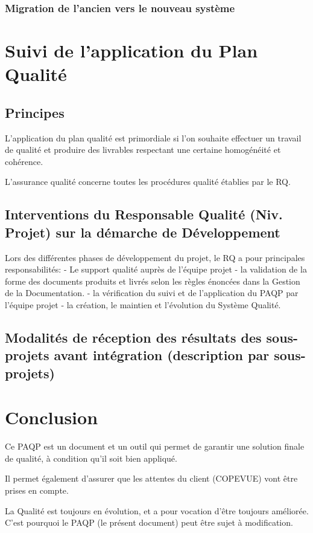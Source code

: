 \documentclass[a4paper]{article}
\begin{document}
\subsubsection{Migration de l'ancien vers le nouveau système}

\section{Suivi de l'application du Plan Qualité}

\subsection{Principes}

L'application du plan qualité est primordiale si l'on souhaite effectuer un travail de qualité et produire des livrables respectant une certaine homogénéité et cohérence.

L'assurance qualité concerne toutes les procédures qualité établies par le RQ.

\subsection{Interventions du Responsable Qualité (Niv. Projet) sur la démarche de Développement}

Lors des différentes phases de développement du projet, le RQ a pour principales responsabilités: - Le support qualité auprès de l'équipe projet - la validation de la forme des documents produits et livrés selon les règles énoncées dans la Gestion de la Documentation. - la vérification du suivi et de l'application du PAQP par l'équipe projet - la création, le maintien et l'évolution du Système Qualité.

\subsection{Modalités de réception des résultats des sous-projets avant intégration (description par sous-projets)}

\section{Conclusion}

Ce PAQP est un document et un outil qui permet de garantir une solution finale de qualité, à condition qu'il soit bien appliqué.

Il permet également d'assurer que les attentes du client (COPEVUE) vont être prises en compte.

La Qualité est toujours en évolution, et a pour vocation d'être toujours améliorée. C'est pourquoi le PAQP (le présent document) peut être sujet à modification.
\end{document}
